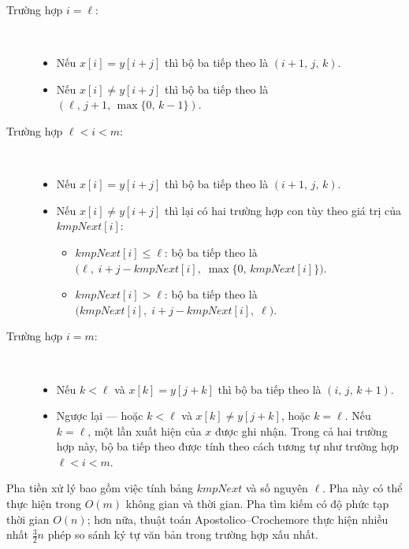\begin{description}

\item[Trường hợp $i = \ell$:] \hfill\\

\begin{itemize}
  \item Nếu $x[i] = y[i+j]$ thì bộ ba tiếp theo là $(i+1,\, j,\, k)$.
  \item Nếu $x[i] \neq y[i+j]$ thì bộ ba tiếp theo là
        $(\ell,\, j+1,\, \max\{0,\, k-1\})$.
\end{itemize}

\item[Trường hợp $\ell < i < m$:] \hfill\\
\begin{itemize}
  \item Nếu $x[i] = y[i+j]$ thì bộ ba tiếp theo là $(i+1,\, j,\, k)$.
  \item Nếu $x[i] \neq y[i+j]$ thì lại có hai trường hợp con tùy theo
        giá trị của $\mathit{kmpNext}[i]$:
        \begin{itemize}
          \item $\mathit{kmpNext}[i] \leq \ell$: bộ ba tiếp theo là
                $\bigl(\ell,\; i+j-\mathit{kmpNext}[i],\;
                \max\{0,\,\mathit{kmpNext}[i]\}\bigr)$.
          \item $\mathit{kmpNext}[i] > \ell$: bộ ba tiếp theo là
                $\bigl(\mathit{kmpNext}[i],\; i+j-\mathit{kmpNext}[i],\;
                \ell\bigr)$.
        \end{itemize}
\end{itemize}

\item[Trường hợp $i = m$:] \hfill\\

\begin{itemize}
    \item Nếu $k < \ell$ và $x[k] = y[j+k]$ thì bộ ba tiếp theo là $(i,\, j,\, k+1)$.
    \item Ngược lại --- hoặc $k < \ell$ và $x[k] \neq y[j+k]$, hoặc $k = \ell$. Nếu $k = \ell$, 
    một lần xuất hiện của $x$ được ghi nhận. 
    Trong cả hai trường hợp này, bộ ba tiếp theo được tính theo cách tương tự như trường hợp $\ell < i < m$.
\end{itemize}


\end{description}

Pha tiền xử lý bao gồm việc tính bảng $\mathit{kmpNext}$ và số nguyên $\ell$.
Pha này có thể thực hiện trong $O(m)$ không gian và thời gian.
Pha tìm kiếm có độ phức tạp thời gian $O(n)$; hơn nữa, thuật toán
Apostolico--Crochemore thực hiện nhiều nhất $\frac{3}{2}n$ phép so sánh
ký tự văn bản trong trường hợp xấu nhất.

